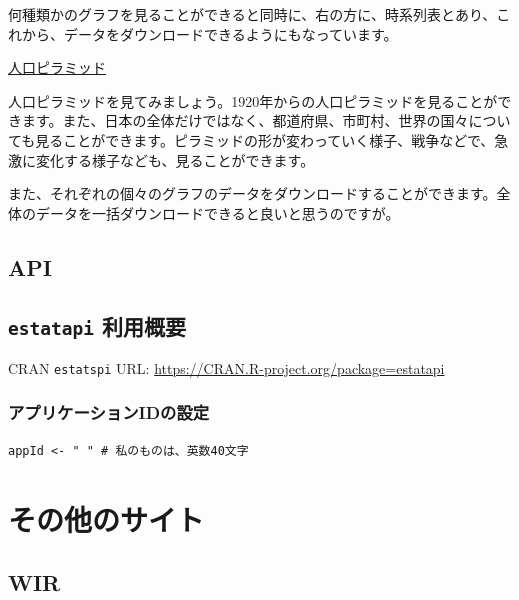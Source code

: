 \documentclass[
  xelatex, ja=standard]{bxjsbook}
\theoremstyle{definition}
\theoremstyle{definition}
\theoremstyle{definition}
\theoremstyle{definition}
\theoremstyle{remark}
\begin{document}
何種類かのグラフを見ることができると同時に、右の方に、時系列表とあり、これから、データをダウンロードできるようにもなっています。

\href{https://dashboard.e-stat.go.jp/pyramidGraph?screenCode=00570\&regionCode=00000\&pyramidAreaType=2}{人口ピラミッド}

人口ピラミッドを見てみましょう。1920年からの人口ピラミッドを見ることができます。また、日本の全体だけではなく、都道府県、市町村、世界の国々についても見ることができます。ピラミッドの形が変わっていく様子、戦争などで、急激に変化する様子なども、見ることができます。

また、それぞれの個々のグラフのデータをダウンロードすることができます。全体のデータを一括ダウンロードできると良いと思うのですが。

\hypertarget{api-4}{%
\section{API}\label{api-4}}

\hypertarget{estatapi-ux5229ux7528ux6982ux8981}{%
\section{\texorpdfstring{\texttt{estatapi} 利用概要}{estatapi 利用概要}}\label{estatapi-ux5229ux7528ux6982ux8981}}

CRAN \texttt{estatspi} URL: \url{https://CRAN.R-project.org/package=estatapi}

\hypertarget{ux30a2ux30d7ux30eaux30b1ux30fcux30b7ux30e7ux30f3idux306eux8a2dux5b9a}{%
\subsection{アプリケーションIDの設定}\label{ux30a2ux30d7ux30eaux30b1ux30fcux30b7ux30e7ux30f3idux306eux8a2dux5b9a}}

\begin{verbatim}
appId <- " " # 私のものは、英数40文字
\end{verbatim}

\hypertarget{other-site}{%
\chapter{その他のサイト}\label{other-site}}

\hypertarget{wir}{%
\section{WIR}\label{wir}}
\end{document}
